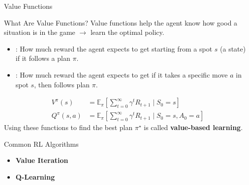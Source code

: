 \documentclass[aspectratio=169,xcolor=dvipsnames]{beamer}
\begin{document}

\begin{frame}{Value Functions}

\begin{block}{What Are Value Functions?}
    Value functions help the agent know how good a situation is in the game $\to$ learn the optimal policy. 
    \begin{itemize}
        \item {}: How much reward the agent expects to get starting from a spot $s$ (a state) if it follows a plan $\pi$.
        \item {}: How much reward the agent expects to get if it takes a specific move $a$ in spot $s$, then follows plan $\pi$.
    \end{itemize}
\end{block}

\small \begin{align*} 
    V^\pi(s) &= \mathbb{E}_\pi\left[\sum_{t=0}^{\infty} \gamma^t R_{t+1} \mid S_0 = s\right] \\
    Q^\pi(s, a) &= \mathbb{E}_\pi\left[\sum_{t=0}^{\infty} \gamma^t R_{t+1} \mid S_0 = s, A_0 = a\right]
\end{align*}
\centering
Using these functions to find the best plan $\pi^\star$ is called \textbf{value-based learning}.

\end{frame}


\begin{frame}{Common RL Algorithms}

\begin{itemize}
    \item \textbf{Value Iteration}  
    \item \textbf{Q-Learning}  
\end{itemize}

\end{frame}

\end{document}
